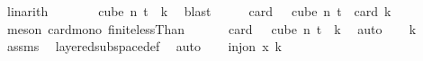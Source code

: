 \begin{isabellebody}
\ linarith\isanewline
\ \ \isamarkupfalse%
\ \isamarkupfalse%
\ {\isachardoublequoteopen}{\isasymchi}\ {\isacharbackquote}{\kern0pt}\ {\isacharparenleft}{\kern0pt}cube\ n\ {\isacharparenleft}{\kern0pt}t{\isacharplus}{\kern0pt}{}{\isacharparenright}{\kern0pt}{\isacharparenright}{\kern0pt}\ {\isasymsubseteq}\ {\isacharbraceleft}{\kern0pt}{\isachardot}{\kern0pt}{\isachardot}{\kern0pt}{\isacharless}{\kern0pt}k{\isacharbraceright}{\kern0pt}{\isachardoublequoteclose}\ \isamarkupfalse%
\ blast\isanewline
\ \ \isamarkupfalse%
\ \isamarkupfalse%
\ {\isachardoublequoteopen}card\ {\isacharparenleft}{\kern0pt}{\isasymchi}\ {\isacharbackquote}{\kern0pt}\ {\isacharparenleft}{\kern0pt}cube\ n\ {\isacharparenleft}{\kern0pt}t{\isacharplus}{\kern0pt}{}{\isacharparenright}{\kern0pt}{\isacharparenright}{\kern0pt}{\isacharparenright}{\kern0pt}\ {\isasymle}\ card\ {\isacharbraceleft}{\kern0pt}{\isachardot}{\kern0pt}{\isachardot}{\kern0pt}{\isacharless}{\kern0pt}k{\isacharbraceright}{\kern0pt}{\isachardoublequoteclose}\ \isanewline
\ \ \ \ \isamarkupfalse%
\ {\isacharparenleft}{\kern0pt}meson\ card{\isacharunderscore}{\kern0pt}mono\ finite{\isacharunderscore}{\kern0pt}lessThan{\isacharparenright}{\kern0pt}\isanewline
\ \ \isamarkupfalse%
\ \isamarkupfalse%
\ {\isacharasterisk}{\kern0pt}{\isacharcolon}{\kern0pt}\ {\isachardoublequoteopen}card\ {\isacharparenleft}{\kern0pt}{\isasymchi}\ {\isacharbackquote}{\kern0pt}\ {\isacharparenleft}{\kern0pt}cube\ n\ {\isacharparenleft}{\kern0pt}t{\isacharplus}{\kern0pt}{}{\isacharparenright}{\kern0pt}{\isacharparenright}{\kern0pt}{\isacharparenright}{\kern0pt}\ {\isasymle}\ k{\isachardoublequoteclose}\ \isamarkupfalse%
\ auto\isanewline
\ \ \isamarkupfalse%
\ {\isachardoublequoteopen}k\ {\isachargreater}{\kern0pt}\ {}{\isachardoublequoteclose}\ \isamarkupfalse%
\ assms{\isacharparenleft}{\kern0pt}{}{\isacharparenright}{\kern0pt}\ \isamarkupfalse%
\ layered{\isacharunderscore}{\kern0pt}subspace{\isacharunderscore}{\kern0pt}def\ \isamarkupfalse%
\ auto\isanewline
\ \ \isamarkupfalse%
\ {\isachardoublequoteopen}inj{\isacharunderscore}{\kern0pt}on\ x\ {\isacharbraceleft}{\kern0pt}{\isachardot}{\kern0pt}{\isachardot}{\kern0pt}k{\isacharbraceright}{\kern0pt}{\isachardoublequoteclose}\isanewline
\ \ \isamarkupfalse%
\ {\isacharminus}{\kern0pt}\isanewline

\end{isabellebody}
